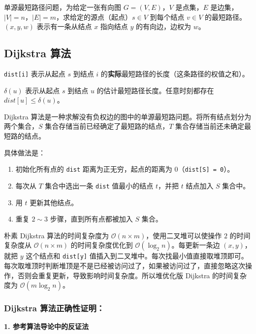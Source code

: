 

单源最短路径问题，为给定一张有向图 $G = (V, E)$，$V$ 是点集，$E$ 是边集，$|V|= n$，$|E| = m$，求给定的源点（起点）$s \in V$ 到每个结点 $v \in V$ 的最短路径。$(x, y, w)$ 表示有一条从结点 $x$ 指向结点 $y$ 的有向边，边权为 $w$。

\subsection{Dijkstra 算法}

\verb|dist[i]| 表示从起点 $s$ 到结点 $i$ 的\textbf{实际}最短路径的长度（这条路径的权值之和）。

$\delta(u)$ 表示从起点 $s$ 到结点 $u$ 的估计最短路径长度。任意时刻都存在 $dist[u] \leq \delta(u)$。
   
Dijkstra 算法是一种求解没有负权边的图中的单源最短路问题。将所有结点划分为两个集合，$S$ 集合存储当前已经确定了最短路的结点，$T$ 集合存储当前还未确定最短路的结点。

具体做法是：
\begin{enumerate}
\item 初始化所有点的 \verb|dist| 距离为正无穷，起点的距离为 $0$（\verb|dist[S] = 0|）。
\item 每次从 $T$ 集合中选出一条 \verb|dist| 值最小的结点 $t$，并把 $t$ 结点加入 $S$ 集合中。
\item 用 $t$ 更新其他结点。
\item 重复 $2 \sim 3$ 步骤，直到所有点都被加入 $S$ 集合。
\end{enumerate}

朴素 Dijkstra 算法的时间复杂度为 $\mathcal{O}(n \times m)$，使用二叉堆可以使操作 $2$ 的时间复杂度从 $\mathcal{O}(n \times m)$ 的时间复杂度优化到 $\mathcal{O}(\log_2 n)$。每更新一条边 $(x, y)$，就把 $y$ 这个结点和 \verb|dist[y]| 值插入到二叉堆中。每次找最小值直接取堆顶即可。每次取堆顶时判断堆顶是不是已经被访问过了，如果被访问过了，直接忽略这次操作，否则会重复更新，导致影响时间复杂度。所以堆优化版 Dijkstra 的时间复杂度为 $\mathcal{O}(m \log_2 n)$。

\subsubsection{Dijkstra 算法正确性证明：}

\textbf{1. 参考算法导论中的反证法}

